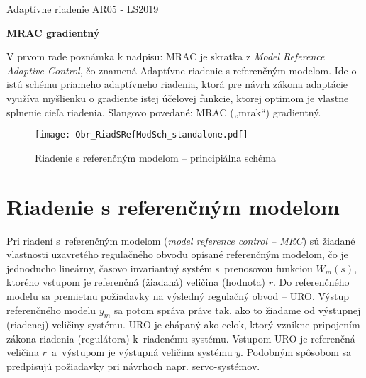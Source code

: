 \documentclass[a4paper, 10pt, ]{article}
\def\oznacenieCasti{AR05 - LS2019}
\begin{document}
\fontsize{12pt}{22pt}\selectfont

\centerline{\textsf{Adaptívne riadenie} \hfill \textsf{\oznacenieCasti}}

\fontsize{18pt}{22pt}\selectfont





\begin{flushleft}
	\textbf{\textsf{MRAC gradientný}}
\end{flushleft}





\normalsize

\bigskip

\tableofcontents

\bigskip

\vspace{18pt}






\noindent
V prvom rade poznámka k nadpisu: MRAC je skratka z \emph{Model Reference Adaptive Control}, čo znamená Adaptívne riadenie s referenčným modelom. Ide o istú schému priameho adaptívneho riadenia, ktorá pre návrh zákona adaptácie využíva myšlienku o gradiente istej účelovej funkcie, ktorej optimom je vlastne splnenie cieľa riadenia. Slangovo povedané: MRAC („mrak“) gradientný.








\begin{figure}[!b]
\centering

	\texttt{[image: Obr\_RiadSRefModSch\_standalone.pdf]}

	\caption{Riadenie s referenčným modelom -- principiálna schéma}
	\label{Riadenie s referenčným modelom --- principiálna schéma}

\end{figure}





\section{Riadenie s referenčným modelom}

Pri riadení s~referenčným modelom (\emph{model reference control -- MRC}) sú žiadané vlastnosti uzavretého regulačného obvodu opísané referenčným modelom, čo je jednoducho lineárny, časovo invariantný systém s~prenosovou funkciou $W_m(s)$, ktorého vstupom je referenčná (žiadaná) veličina (hodnota) $r$. Do referenčného modelu sa premietnu požiadavky na výsledný regulačný obvod -- URO. Výstup referenčného modelu $y_m$ sa potom správa práve tak, ako to žiadame od výstupnej (riadenej) veličiny systému.  URO je chápaný ako celok, ktorý vznikne pripojením zákona riadenia (regulátora) k~riadenému systému. Vstupom URO je referenčná veličina $r$~a~výstupom je výstupná veličina systému $y$. Podobným spôsobom sa predpisujú požiadavky pri návrhoch napr. servo-systémov.
\end{document}
